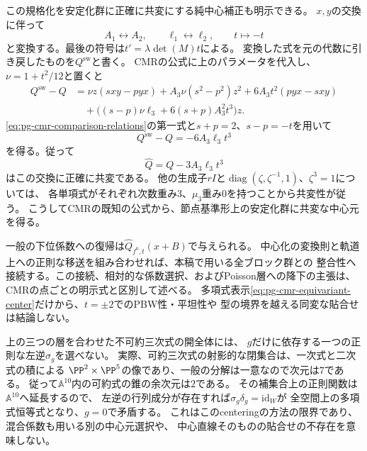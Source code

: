 \begin{remark}[節点型の既知の明示中心元との関係]
この規格化を安定化群に正確に共変にする純中心補正も明示できる。
$x,y$の交換に伴って
\begin{equation}
 A_1\leftrightarrow A_2,\qquad
 \ell_1\leftrightarrow\ell_2,\qquad t\longmapsto-t
 \label{eq:pg-cmr-swap-action}
\end{equation}
と変換する。最後の符号は$t'=\lambda\det(M)t$による。
変換した式を元の代数に引き戻したものを$Q^{\mathrm{sw}}$と書く。
CMRの公式に上のパラメータを代入し、$\nu=1+t^2/12$と置くと
\begin{equation}
 \begin{aligned}
 Q^{\mathrm{sw}}-Q
 &=\nu z(sxy-pyx)+A_3\nu(s^2-p^2)z^2
      +6A_3t^2(pyx-sxy)\\
 &\quad+\bigl((s-p)\nu\ell_3+6(s+p)A_3^2t^3\bigr)z.
 \end{aligned}
 \label{eq:pg-cmr-swap-computation}
\end{equation}
\eqref{eq:pg-cmr-comparison-relations}の第一式と$s+p=2$、$s-p=-t$を用いて
\begin{equation}
 Q^{\mathrm{sw}}-Q=-6A_3\ell_3t^3
 \label{eq:pg-cmr-swap-discrepancy}
\end{equation}
を得る。従って
\begin{equation}
 \widehat Q=Q-3A_3\ell_3t^3
 \label{eq:pg-cmr-equivariant-center}
\end{equation}
はこの交換に正確に共変である。
他の生成子$rI$と$\operatorname{diag}(\zeta,\zeta^{-1},1)$、$\zeta^3=1$については、
各単項式がそれぞれ次数重み$3$、$\mu_3$重み$0$を持つことから共変性が従う。
こうしてCMRの既知の公式から、節点基準形上の安定化群に共変な中心元を得る。

一般の下位係数への復帰は$\widehat Q_{f^0,t}(x+B)$で与えられる。
中心化の変換則と軌道上への正則な移送を組み合わせれば、本稿で用いる全ブロック群との
整合性へ接続する。この接続、相対的な係数選択、およびPoisson層への降下の主張は、
CMRの点ごとの明示式と区別して述べる。
多項式表示\eqref{eq:pg-cmr-equivariant-center}だけから、$t=\pm2$でのPBW性・平坦性や
型の境界を越える同変な貼合せは結論しない。
\end{remark}

\begin{remark}[層ごとの選択と貼合せの限界]
\label{rem:pg-equivariant-stratumwise-centering}
上の三つの層を合わせた不可約三次式の開全体には、
$g$だけに依存する一つの正則な左逆$\sigma_g$を選べない。
実際、可約三次式の射影的な閉集合は、一次式と二次式の積による
$\PP^2\times\PP^5$の像であり、一般の分解は一意なので次元は$7$である。
従って$\mathbb A^{10}$内の可約式の錐の余次元は$2$である。
その補集合上の正則関数は$\mathbb A^{10}$へ延長するので、
左逆の行列成分が存在すれば$\sigma_g\delta_g=\mathrm{id}_W$が
全空間上の多項式恒等式となり、$g=0$で矛盾する。
これはこのcenteringの方法の限界であり、混合係数も用いる別の中心元選択や、
中心直線そのものの貼合せの不存在を意味しない。
\end{remark}

